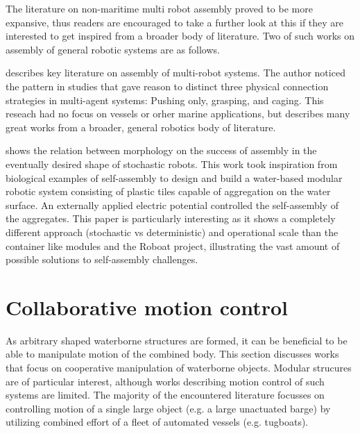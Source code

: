 The literature on non-maritime multi robot assembly proved to be more expansive, thus readers are encouraged to take a further look at this if they are interested to get inspired from a broader body of literature. Two of such works on assembly of general robotic systems are as follows.

\citet{tuci2018cooperative} describes key literature on assembly of multi-robot systems. The author noticed the pattern in studies that gave reason to distinct three physical connection strategies in multi-agent systems: Pushing only, grasping, and caging. This reseach had no focus on vessels or orher marine applications, but describes many great works from a broader, general robotics body of literature. 

\citet{miyashita2008morphology} shows the relation between morphology on the success of assembly in the eventually desired shape of stochastic robots. This work took inspiration from biological examples of self-assembly to design and build a water-based modular robotic system consisting of plastic tiles capable of aggregation on the water surface. An externally applied electric potential controlled the self-assembly of the aggregates. This paper is particularly interesting as it shows a completely different approach (stochastic vs deterministic) and operational scale than the container like modules and the Roboat project, illustrating the vast amount of possible solutions to self-assembly challenges. 

\section{Collaborative motion control}
\label{literatureConfigurationDependentControl}

As arbitrary shaped waterborne structures are formed, it can be beneficial to be able to manipulate motion of the combined body. This section discusses works that focus on cooperative manipulation of waterborne objects. Modular strucures are of particular interest, although works describing motion control of such systems are limited. The majority of the encountered literature focusses on controlling motion of a single large object  (e.g. a large unactuated barge) by utilizing combined effort of  a fleet of automated vessels (e.g. tugboats). 

